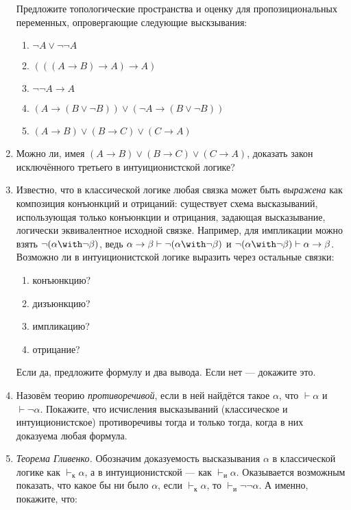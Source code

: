 \documentclass[10pt,a4paper,oneside]{article}
\begin{document}
\begin{enumerate}
Предложите топологические пространства и оценку для пропозициональных переменных,
опровергающие следующие выскзывания:

\begin{enumerate}
\item $\neg A \vee \neg\neg A $
\item $(((A \rightarrow B) \rightarrow A) \rightarrow A)$
\item $\neg\neg A \rightarrow A$
\item $(A \rightarrow (B \vee \neg B)) \vee (\neg A \rightarrow (B \vee \neg B))$
\item $(A \rightarrow B) \vee (B \rightarrow C) \vee (C \rightarrow A)$
\end{enumerate}

\item Можно ли, имея $(A \rightarrow B) \vee (B \rightarrow C) \vee (C \rightarrow A)$, доказать
закон исключённого третьего в интуиционистской логике?

\item Известно, что в классической логике любая связка может быть \emph{выражена} как композиция 
конъюнкций и отрицаний: существует схема высказываний, использующая только конъюнкции и отрицания, 
задающая высказывание, логически эквивалентное исходной связке. 
Например, для импликации можно взять $\neg(\alpha\with\neg\beta)$, ведь 
$\alpha\rightarrow\beta\vdash\neg(\alpha\with\neg\beta)$ и $\neg(\alpha\with\neg\beta)\vdash\alpha\rightarrow\beta$. 
Возможно ли в интуиционистской логике выразить через остальные связки:
\begin{enumerate}
\item конъюнкцию?
\item дизъюнкцию?
\item импликацию?
\item отрицание?
\end{enumerate}
Если да, предложите формулу и два вывода. Если нет --- докажите это.

\item Назовём теорию \emph{противоречивой}, если в ней найдётся такое $\alpha$, что $\vdash\alpha$ и $\vdash\neg\alpha$.
Покажите, что исчисления высказываний (классическое и интуиционистское) противоречивы тогда и только тогда, 
когда в них доказуема любая формула. 

\item \emph{Теорема Гливенко.} Обозначим доказуемость высказывания $\alpha$ в классической логике 
как $\vdash_\text{к}\alpha$, а в интуиционистской --- как $\vdash_\text{и}\alpha$. 
Оказывается возможным показать, что какое бы ни было $\alpha$, если $\vdash_\text{к}\alpha$, 
то $\vdash_\text{и}\neg\neg\alpha$. А именно, покажите, что:


\end{enumerate}
\end{document}
